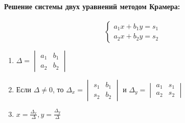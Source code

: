 \documentclass[a4paper,14pt]{article}
\begin{document}
\paragraph{Решение системы двух уравнений методом Крамера:}
\[
\begin{cases}
	a_1x + b_1y = s_1 \\
	a_2x + b_2y = s_2
\end{cases}
\]
\begin{enumerate}
	\item $\Delta = \begin{vmatrix}a_1 & b_1 \\ a_2 & b_2\end{vmatrix}$
	\item Если $\Delta \ne 0$, то $\Delta_x = \begin{vmatrix}s_1 & b_1 \\ s_2 & b_2\end{vmatrix}$ и $\Delta_y = \begin{vmatrix}a_1 & s_1 \\ a_2 & s_2\end{vmatrix}$
	\item $x = \frac{\Delta_x}{\Delta}, y = \frac{\Delta_y}{\Delta}$
\end{enumerate}
\end{document}
